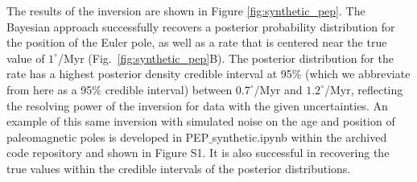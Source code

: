 \documentclass[]{agujournal2019}
\begin{document}
The results of the inversion are shown in Figure \ref{fig:synthetic_pep}. The Bayesian approach successfully recovers a posterior probability distribution for the position of the Euler pole, as well as a rate that is centered near the true value of $1^\circ$/Myr (Fig.~\ref{fig:synthetic_pep}B). The posterior distribution for the rate has a highest posterior density credible interval at 95\% (which we abbreviate from here as a 95\% credible interval) between $0.7^\circ$/Myr and $1.2^\circ$/Myr, reflecting the resolving power of the inversion for data with the given uncertainties. An example of this same inversion with simulated noise on the age and position of paleomagnetic poles is developed in PEP$\_$synthetic.ipynb within the archived code repository and shown in Figure S1. It is also successful in recovering the true values within the credible intervals of the posterior distributions.
\end{document}
